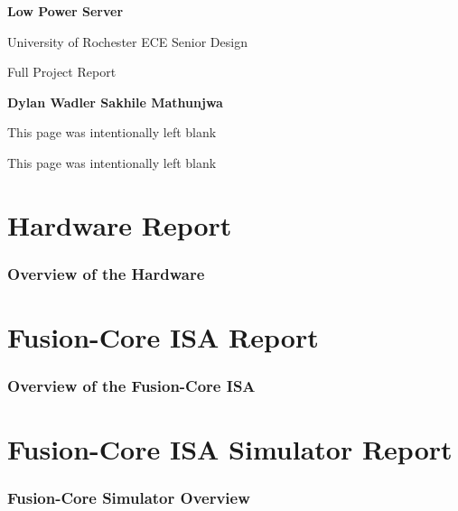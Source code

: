 \documentclass[letterpaper, 11pt, twoside]{article}
\begin{document}
	
	\begin{titlepage}
		\begin{center}
			
			\vspace*{1cm}
			\Huge
			\textbf{Low Power Server}
			
			\vspace{0.5cm}
			\LARGE
			University of Rochester ECE Senior Design 
			
			\vspace{1cm}
			\LARGE
			Full Project Report
			\vspace{1.5cm}
			
			\textbf{Dylan Wadler \hspace{0.2cm} Sakhile Mathunjwa} 
			\vfill
			
			
		\end{center}
	\end{titlepage}
	\clearpage
	
	\begin{center}
		This page was intentionally left blank
	\end{center}
	
	\clearpage
	\setcounter{page}{1}
	\tableofcontents
	
	\clearpage
	
	\begin{center}
		This page was intentionally left blank
	\end{center}
	
	\clearpage
	
	\part[Hardware]{Hardware Report}
	
	\section[Hardware Overview]{Overview of the Hardware}
	\subsection{}
	
	\clearpage
	
	\part[Fusion-Core ISA]{Fusion-Core ISA Report}
	\section[Fusion-Core Overview]{Overview of the Fusion-Core ISA}
	\subsection{}
	
	\clearpage
	
	\part[Simulator]{Fusion-Core ISA Simulator Report}
	\section[Simulator Overview]{Fusion-Core Simulator Overview}
	\subsection{}

	\clearpage	
	
\end{document}
